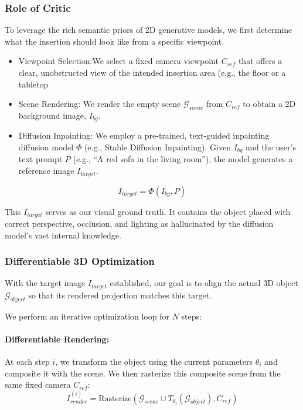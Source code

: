 \documentclass[pdflatex,sn-mathphys-num]{sn-jnl}%
\theoremstyle{thmstyleone}%
\theoremstyle{thmstyletwo}%
\theoremstyle{thmstylethree}%
\begin{document}
\subsubsection{Role of Critic}
To leverage the rich semantic priors of 2D generative models, we first determine what the insertion should look like from a specific viewpoint.
\begin{itemize}
    \item{Viewpoint Selection:We select a fixed camera viewpoint $C_{ref}$ that offers a clear, unobstructed view of the intended insertion area (e.g., the floor or a tabletop} 
    \item{Scene Rendering:}
We render the empty scene $\mathcal{G}_{scene}$ from $C_{ref}$ to obtain a 2D background image, $I_{bg}$. 
    \item {Diffusion Inpainting:}
We employ a pre-trained, text-guided inpainting diffusion model $\Phi$ (e.g., Stable Diffusion Inpainting). Given $I_{bg}$ and the user's text prompt $P$ (e.g., ``A red sofa in the living room''), the model generates a reference image $I_{target}$.
\end{itemize}

\[
I_{target} = \Phi(I_{bg}, P)
\]

This $I_{target}$ serves as our visual ground truth. It contains the object placed with correct perspective, occlusion, and lighting as hallucinated by the diffusion model's vast internal knowledge.

\subsubsection{Differentiable 3D Optimization}
With the target image $I_{target}$ established, our goal is to align the actual 3D object $\mathcal{G}_{object}$ so that its rendered projection matches this target.

We perform an iterative optimization loop for $N$ steps:

\paragraph{Differentiable Rendering:}
At each step $i$, we transform the object using the current parameters $\theta_i$ and composite it with the scene. We then rasterize this composite scene from the same fixed camera $C_{ref}$:
\[
I_{render}^{(i)} =
\text{Rasterize}(\mathcal{G}_{scene} \cup T_{\theta_i}(\mathcal{G}_{object}), C_{ref})
\]
\end{document}
